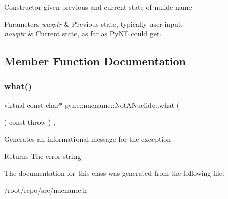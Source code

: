 Constructor given previous and current state of nulide name 
\begin{DoxyParams}{Parameters}
{\em wasptr} & Previous state, typically user input. \\
\hline
{\em nowptr} & Current state, as far as Py\+NE could get. \\
\hline
\end{DoxyParams}


\subsection{Member Function Documentation}
\mbox{\label{classpyne_1_1nucname_1_1_not_a_nuclide_a989e97e1915b17eabeacb12a5dc210aa}} 
\subsubsection{\texorpdfstring{what()}{what()}}
{\footnotesize\ttfamily virtual const char$\ast$ pyne\+::nucname\+::\+Not\+A\+Nuclide\+::what (\begin{DoxyParamCaption}{ }\end{DoxyParamCaption}) const throw  ) \hspace{0.3cm}{\ttfamily [inline]}, {\ttfamily [virtual]}}

Generates an informational message for the exception \begin{DoxyReturn}{Returns}
The error string 
\end{DoxyReturn}


The documentation for this class was generated from the following file\+:\begin{DoxyCompactItemize}
\item 
/root/repo/src/nucname.\+h\end{DoxyCompactItemize}
